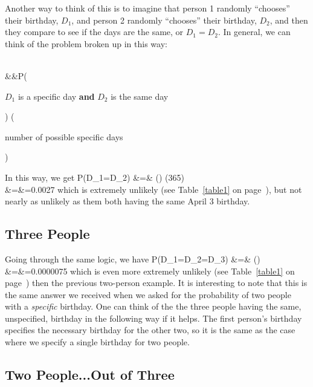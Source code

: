 Another way to think of this is to imagine that person 1 randomly ``chooses'' their birthday, $D_{1}$, and person 2 randomly ``chooses'' their birthday, $D_{2}$, and then they compare to see if the days are the same, or $D_{1}=D_{2}$.  In general, we can think of the problem broken up in this way:


\beqn
{}\\
&&P\left(\parbox{1.5in}{$D_{1}$ is a specific day {\bf and} $D_{2}$ is the same day}\right) \times\left(\parbox{1.3in}{number of possible specific days}\right)
\eeqn

In this way, we get \beqn
P(D_{1}=D_{2}) &=& \left(\times{}\right) \times \left(365\right)\\
&=&=0.0027
\eeqn
which is extremely unlikely (see Table~\ref{table1} on page~\pageref{table1}), but not nearly as unlikely as them both having the same April 3 birthday.

\subsection{Three People}
 Going through the same logic, we have
\beqn
P(D_{1}=D_{2}=D_{3}) &=& \left(\times{}\times{}\right)\\
&=&=0.0000075
\eeqn
which is even more extremely unlikely (see Table~\ref{table1} on page~\pageref{table1}) then the previous two-person example.  It is interesting to note that this is the same answer we received when we asked for the probability of two people with a {\em specific} birthday.  One can think of the the three people having the same, unspecified, birthday in the following way if it helps.  The first person's birthday specifies the necessary birthday for the other two, so it is the same as the case where we specify a single birthday for two people.

\subsection{Two People...Out of Three}

